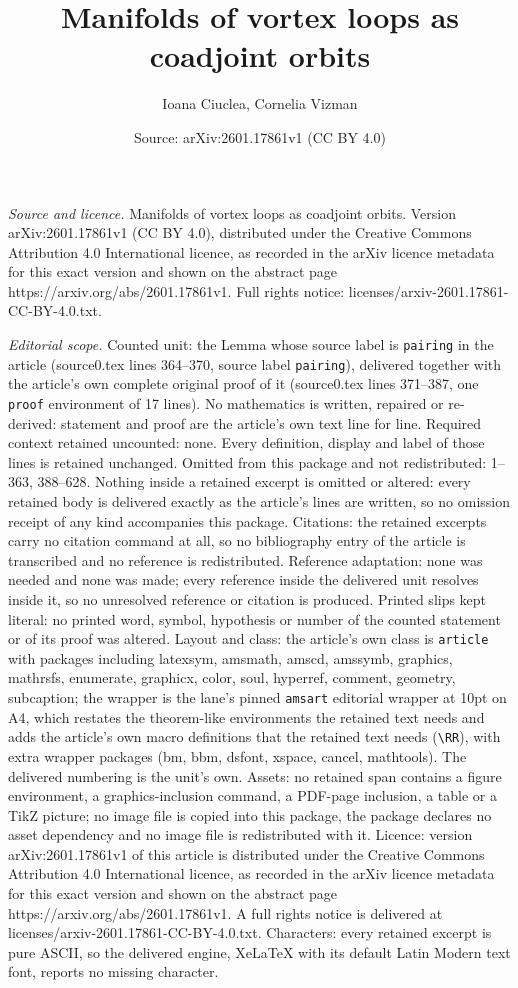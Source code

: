 \documentclass[10pt,a4paper]{amsart}
\title[Manifolds of vortex loops as coadjoint orbits]{Manifolds of vortex loops as coadjoint orbits}
\author{Ioana Ciuclea, Cornelia Vizman}
\date{Source: arXiv:2601.17861v1 (CC BY 4.0)}
\begin{document}
\maketitle

\noindent\emph{Source and licence.} Manifolds of vortex loops as coadjoint orbits. Version arXiv:2601.17861v1 (CC BY 4.0), distributed under the Creative Commons Attribution 4.0 International licence, as recorded in the arXiv licence metadata for this exact version and shown on the abstract page https://arxiv.org/abs/2601.17861v1. Full rights notice: licenses/arxiv-2601.17861-CC-BY-4.0.txt.\par\smallskip

\noindent\textit{Editorial scope.} Counted unit: the Lemma whose source label is \texttt{pairing} in the article (source0.tex lines 364--370, source label \texttt{pairing}), delivered together with the article's own complete original proof of it (source0.tex lines 371--387, one \texttt{proof} environment of 17 lines). No mathematics is written, repaired or re-derived: statement and proof are the article's own text line for line. Required context retained uncounted: none. Every definition, display and label of those lines is retained unchanged. Omitted from this package and not redistributed: 1--363, 388--628. Nothing inside a retained excerpt is omitted or altered: every retained body is delivered exactly as the article's lines are written, so no omission receipt of any kind accompanies this package. Citations: the retained excerpts carry no citation command at all, so no bibliography entry of the article is transcribed and no reference is redistributed. Reference adaptation: none was needed and none was made; every reference inside the delivered unit resolves inside it, so no unresolved reference or citation is produced. Printed slips kept literal: no printed word, symbol, hypothesis or number of the counted statement or of its proof was altered. Layout and class: the article's own class is \texttt{article} with packages including latexsym, amsmath, amscd, amssymb, graphics, mathrsfs, enumerate, graphicx, color, soul, hyperref, comment, geometry, subcaption; the wrapper is the lane's pinned \texttt{amsart} editorial wrapper at 10pt on A4, which restates the theorem-like environments the retained text needs and adds the article's own macro definitions that the retained text needs (\texttt{\textbackslash RR}), with extra wrapper packages (bm, bbm, dsfont, xspace, cancel, mathtools). The delivered numbering is the unit's own. Assets: no retained span contains a figure environment, a graphics-inclusion command, a PDF-page inclusion, a table or a TikZ picture; no image file is copied into this package, the package declares no asset dependency and no image file is redistributed with it. Licence: version arXiv:2601.17861v1 of this article is distributed under the Creative Commons Attribution 4.0 International licence, as recorded in the arXiv licence metadata for this exact version and shown on the abstract page https://arxiv.org/abs/2601.17861v1. A full rights notice is delivered at licenses/arxiv-2601.17861-CC-BY-4.0.txt. Characters: every retained excerpt is pure ASCII, so the delivered engine, XeLaTeX with its default Latin Modern text font, reports no missing character.
\end{document}
